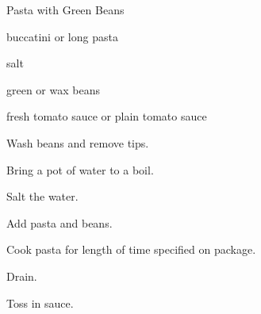 \begin{recipe}{Pasta with Green Beans}{}{}

\begin{ingredients}
\item buccatini or long pasta
\item salt
\item green or wax beans
\item fresh tomato sauce or plain tomato sauce
\end{ingredients}

\begin{directions}
\item Wash beans and remove tips.
\item Bring a pot of water to a boil.
\item Salt the water.
\item Add pasta and beans.
\item Cook pasta for length of time specified on package.
\item Drain.
\item Toss in sauce.
\end{directions}

\end{recipe}

